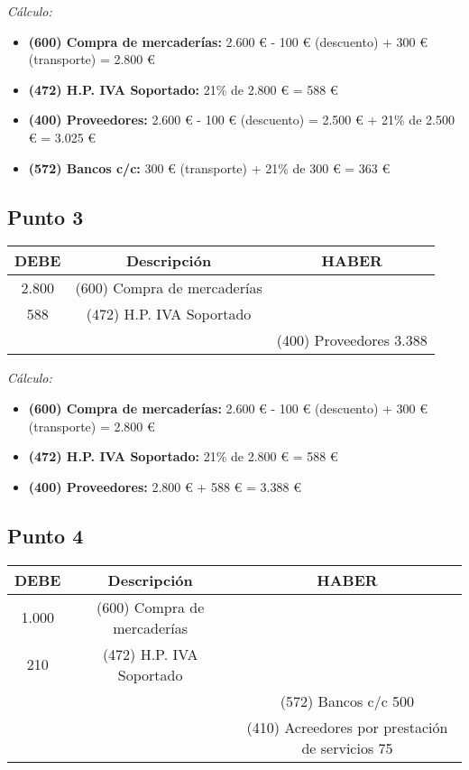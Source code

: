\documentclass{article}
\begin{document}
\textit{Cálculo:}
\begin{itemize}
    \item \textbf{(600) Compra de mercaderías:} 2.600 € - 100 € (descuento) + 300 € (transporte) = 2.800 €
    \item \textbf{(472) H.P. IVA Soportado:} 21\% de 2.800 € = 588 €
    \item \textbf{(400) Proveedores:} 2.600 € - 100 € (descuento) = 2.500 € + 21\% de 2.500 € = 3.025 €
    \item \textbf{(572) Bancos c/c:} 300 € (transporte) + 21\% de 300 € = 363 €
\end{itemize}

\subsection*{Punto 3}
\begin{table}[H]
\centering
\begin{tabular}{|c|c|c|}
\hline
\textbf{DEBE} & \textbf{Descripción} & \textbf{HABER} \\
\hline
2.800 & (600) Compra de mercaderías &  \\
588 & (472) H.P. IVA Soportado &  \\
 & & (400) Proveedores 3.388 \\
\hline
\end{tabular}
\end{table}

\textit{Cálculo:}
\begin{itemize}
    \item \textbf{(600) Compra de mercaderías:} 2.600 € - 100 € (descuento) + 300 € (transporte) = 2.800 €
    \item \textbf{(472) H.P. IVA Soportado:} 21\% de 2.800 € = 588 €
    \item \textbf{(400) Proveedores:} 2.800 € + 588 € = 3.388 €
\end{itemize}

\subsection*{Punto 4}
\begin{table}[H]
\centering
\begin{tabular}{|c|c|c|}
\hline
\textbf{DEBE} & \textbf{Descripción} & \textbf{HABER} \\
\hline
1.000 & (600) Compra de mercaderías &  \\
210 & (472) H.P. IVA Soportado &  \\
 & & (572) Bancos c/c 500 \\
 & & (410) Acreedores por prestación de servicios 75 \\
\hline
\end{tabular}
\end{table}
\end{document}

